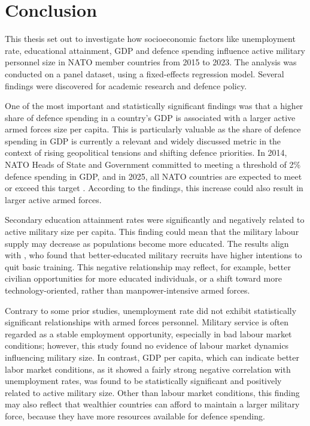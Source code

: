\chapter{Conclusion}

This thesis set out to investigate how socioeconomic factors like unemployment rate, educational 
attainment, GDP and defence spending influence active military personnel size in NATO member countries 
from 2015 to 2023. The analysis was conducted on a panel dataset, using a fixed-effects regression model.
Several findings were discovered for academic research and defence policy.

One of the most important and statistically significant findings was that a higher share of defence 
spending in a country's GDP is associated with a larger active armed forces size per capita.
This is particularly valuable as the share of defence spending in GDP is currently a relevant and 
widely discussed metric in the context of rising geopolitical tensions and shifting defence priorities.
In 2014, NATO Heads of State and Government committed to meeting a threshold of 2\% defence spending in GDP, and in 2025, all NATO countries are expected to meet or exceed this target \parencite{nato_defence_2025}. 
According to the findings, this increase could also result in larger active armed forces.

Secondary education attainment rates were significantly and negatively related to active military 
size per capita. This finding could mean that the military labour 
supply may decrease as populations become more educated. The results align with \textcite{hof_quality_2023}, 
who found that better-educated military recruits have higher intentions to quit basic training.
This negative relationship may reflect, for example, better civilian opportunities 
for more educated individuals, or a shift toward more technology-oriented, rather than 
manpower-intensive armed forces.

Contrary to some prior studies, unemployment rate did not exhibit statistically significant 
relationships with armed forces personnel. Military service is often regarded as a stable
employment opportunity, especially in bad labour market conditions; however, this study found 
no evidence of labour market dynamics influencing military size. In contrast, GDP per capita, 
which can indicate better labor market conditions, as it showed a fairly strong negative 
correlation with unemployment rates, was 
found to be statistically significant and positively related to active military size. 
Other than labour market conditions, this finding may also reflect that 
wealthier countries can afford to maintain a larger military force, because they 
have more resources available for defence spending. 

